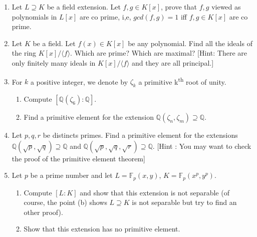 \documentclass[12pt,a4paper]{article}
\newcommand{\Q}{\mathbb{Q}}
\newcommand{\F}{\mathbb{F}}
\begin{document}
\begin{enumerate}
\item Let $L⊇K$ be a field extension. Let $f,g\in K[x]$, prove that $f,g$ viewed as polynomials in $L[x]$ are co prime, i,e, $gcd(f,g)=1$ iff $f,g\in K[x]$ are co prime.

\item Let $K$ be a field. Let $f(x)\in K[x]$ be any polynomial. Find all the ideals of the ring $K[x]/〈f〉$. Which are prime? Which are maximal? [Hint: There are only finitely many ideals in $K[x]/〈f〉$ and they are all principal.]

\item For $k$ a positive integer, we denote by $\zeta_k$ a primitive k\textsuperscript{th} root of unity.
\begin{enumerate} 
	\item Compute $[\Q(\zeta_6) : \Q]$.
	\item Find a primitive element for the extension $\Q(\zeta_n, \zeta_m) ⊇\Q$.
\end{enumerate}{}

\item Let $p, q, r$ be distincts primes. Find a primitive element for the extensions $\Q(\sqrt{p}, \sqrt{q})⊇\Q$ and $\Q(\sqrt{p}, \sqrt{q}, \sqrt{r})⊇\Q$. [Hint : You may want to check the proof of the primitive element theorem] 

\item  Let $p$ be a prime number and let $L = \F_p(x, y)$, $K = \F_p(x^p, y^p)$.
\begin{enumerate}
	\item Compute $[L : K]$ and show that this extension is not separable (of course, the point (b) shows $L⊇K$ is not separable but try to find an other proof).
	\item Show that this extension has no primitive element.
\end{enumerate}

\end{enumerate}
\end{document}
